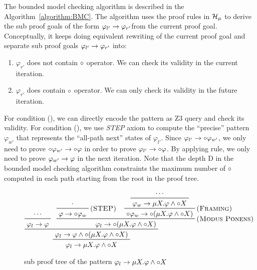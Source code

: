 \documentclass{almostllncs}
\begin{document}
The bounded model checking algorithm is described in the Algorithm~\ref{algorithm:BMC}.
The algorithm uses the proof rules in $\mathcal{H}_\mu$ to derive the sub proof goals of the form $\varphi_{l'} \to \varphi_{r'}$from the current proof goal.
Conceptually, it keeps doing equivalent rewriting of the current proof goal and separate sub proof goals $\varphi_{l'} \to \varphi_{r'}$ into:

\vspace{-1ex}
\begin{enumerate}[label=(\roman*), leftmargin=2\parindent]
\item $\varphi_{r'}$ does not contain ${\circ}$ operator.
      We can check its validity in the current iteration.
\item $\varphi_{r'}$ does contain ${\circ}$ operator.
      We can only check its validity in the future iteration.
\end{enumerate}
\vspace{-1ex}

\noindent
For condition (), we can directly encode the pattern as Z3 query and check its validity.
For condition (), we use \emph{STEP} axiom to compute the ``precise'' pattern $\varphi_{w'}$ that represents the ``all-path next'' states of $\varphi_{l'}$.
Since $\varphi_{l'} \to {\circ} \varphi_{w'}$, we only need to prove ${\circ} \varphi_{w'} \to {\circ} \varphi$ in order to prove $\varphi_{l'} \to {\circ} \varphi$. By applying \framing rule, we only need to prove $ \varphi_{w'} \to \varphi$ in the next iteration.
Note that the depth D in the bounded model checking algorithm constraints the maximum number of ${\circ}$ computed in each path starting from the root in the proof tree.

\begin{figure}[!ht]

\begin{displaymath}
\prftree
{\prftree
 {\prftree
  {\cdots}
  {\varphi_l \imp \varphi}
 }
 {\prftree[r]{\modusponens}
  {\prftree[r]{\step}
   {\cdot}
   {\varphi \imp \wnext \varphi_w}
  }
  {\prftree[r]{\framing}
   {\prftree
   	{\cdots}
   	{\varphi_w \imp \mu X \ldot \varphi \wedge \wnext X}
   }
   {\wnext \varphi_w \imp  \wnext (\mu X \ldot \varphi \wedge \wnext X)}
  }
  {\varphi_l \imp \wnext (\mu X \ldot \varphi \wedge \wnext X)}
 }
 {\varphi_l \imp \varphi \wedge \wnext (\mu X \ldot \varphi \wedge \wnext X)}
}
{\varphi_l \imp \mu X \ldot \varphi \wedge \wnext X}
\end{displaymath}
\caption{sub proof tree of the pattern $\varphi_l \to \mu X \mathord{.} \varphi \wedge {\circ} X$}
\label{fig:proof-tree}
\end{figure}
\end{document}
